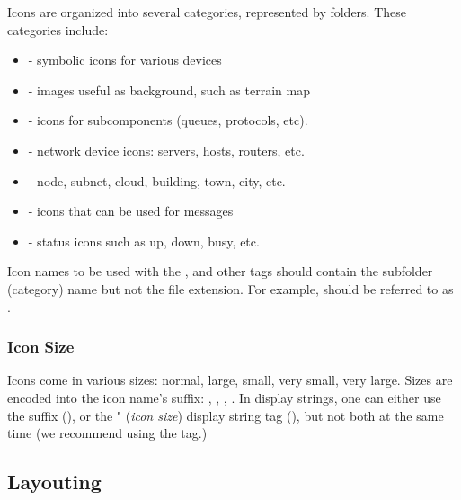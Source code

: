 Icons are organized into several categories, represented by folders.
These categories include:

\begin{itemize}
  \item {} - symbolic icons for various devices
  \item {} - images useful as background, such as terrain map
  \item {} - icons for subcomponents (queues, protocols, etc).
  \item {} - network device icons: servers, hosts, routers, etc.
  \item {} - node, subnet, cloud, building, town, city, etc.
  \item {} - icons that can be used for messages
  \item {} - status icons such as up, down, busy, etc.
\end{itemize}

Icon names to be used with the ,  and other tags should
contain the subfolder (category) name but not the file extension. For
example,  should be referred to as
.


\subsubsection{Icon Size}
\label{sec:graphics:icon-size}

Icons come in various sizes: normal, large, small, very small, very large.
Sizes are encoded into the icon name's suffix: , ,
, . In display strings, one can either use the suffix
(), or the " (\textit{icon size})
display string tag (), but not both at the same
time (we recommend using the  tag.)


\subsection{Layouting}
\label{sec:graphics:compound-module-layouting}

